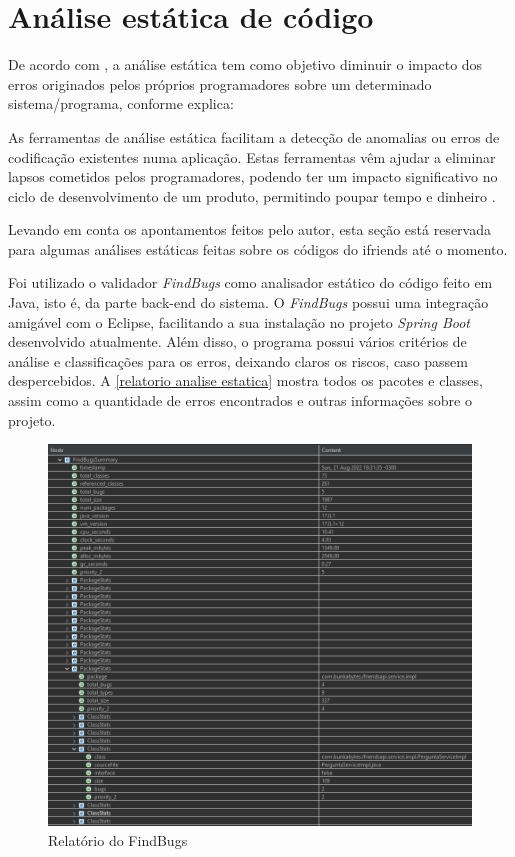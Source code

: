 \section{Análise estática de código}

De acordo com , a análise estática tem como objetivo diminuir o impacto dos erros originados pelos próprios programadores sobre um determinado sistema/programa, conforme explica:

\begin{citacao}
As ferramentas de análise estática facilitam a detecção de anomalias ou erros de codificação existentes numa aplicação. Estas ferramentas vêm ajudar a eliminar lapsos cometidos
pelos programadores, podendo ter um impacto significativo no ciclo de desenvolvimento de
um produto, permitindo poupar tempo e dinheiro \cite{teixeira2007avaliaccao}.
\end{citacao}

Levando em conta os apontamentos feitos pelo autor, esta seção está reservada para algumas análises estáticas feitas sobre os códigos do \gls{ifriends} até o momento.

Foi utilizado o validador \textsl{FindBugs} como analisador estático do código feito em Java, isto é, da parte \gls{back-end} do sistema. O \textsl{FindBugs} possui uma integração amigável com o \gls{Eclipse}, facilitando a sua instalação no projeto \textsl{Spring Boot} desenvolvido atualmente. Além disso, o programa possui vários critérios de análise e classificações para os erros, deixando claros os riscos, caso passem despercebidos. A \autoref{relatorio analise estatica} mostra todos os pacotes e classes, assim como a quantidade de erros encontrados e outras informações sobre o projeto.

\begin{figure}[htb]
\centering
\caption{\label{relatorio analise estatica} Relatório do FindBugs}
\includegraphics[width=1\textwidth]{anexos/Imagens_AnaliseEstatica/relatorio-findbugs.png}
\end{figure}
\FloatBarrier

